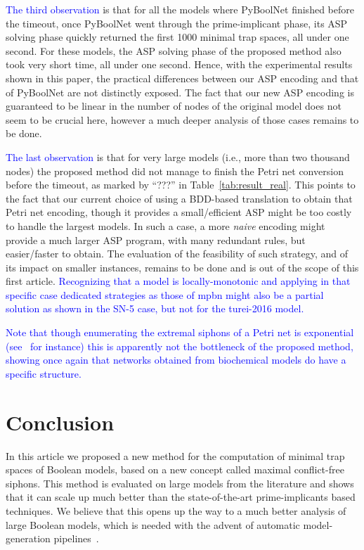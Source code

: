 \documentclass[runningheads]{llncs}
\newcommand{\revise}[1]{\textcolor{blue}{#1}}
\begin{document}
\revise{The third observation} is that for all the models where PyBoolNet finished before the timeout, once PyBoolNet went through the prime-implicant phase, its ASP solving phase quickly returned the first 1000 minimal trap spaces, all under one second.
For these models, the ASP solving phase of the proposed method also took very short time, all under one second.
Hence, with the experimental results shown in this paper, the practical differences between our ASP encoding and that of PyBoolNet are not distinctly exposed.
The fact that our new ASP encoding is guaranteed to be linear in the number of nodes of the original model does not seem to be crucial here, however a much deeper analysis of those cases remains to be done.

\revise{The last observation} is that for very large models (i.e., more than two thousand nodes) the proposed method did not manage to finish the Petri net conversion before the timeout, as marked by ``???'' in Table~\ref{tab:result_real}.
This points to the fact that our current choice of using a BDD-based translation to obtain that Petri net encoding, though it provides a small/efficient ASP might be too costly to handle the largest models.
In such a case, a more \emph{naive} encoding might provide a much larger ASP program, with many redundant rules, but easier/faster to obtain.
The evaluation of the feasibility of such strategy, and of its impact on smaller instances, remains to be done and is out of the scope of this first article.
\revise{Recognizing that a model is locally-monotonic and applying in that specific case dedicated strategies as those of mpbn might also be a partial solution as shown in the SN-5 case, but not for the turei-2016 model.}

\revise{Note that though enumerating the extremal siphons of a Petri net is exponential (see~\cite{nabli2016enumerating} for instance) this is apparently not the bottleneck of the proposed method, showing once again that networks obtained from biochemical models do have a specific structure.}

\section{Conclusion}

In this article we proposed a new method for the computation of minimal trap spaces of Boolean models, based on a new concept called maximal conflict-free siphons.
This method is evaluated on large models from the literature and shows that it can scale up much better than the state-of-the-art prime-implicants based techniques.
We believe that this opens up the way to a much better analysis of large Boolean models, which is needed with the advent of automatic model-generation pipelines~\cite{ostaszewski2021covid19}.
\end{document}
